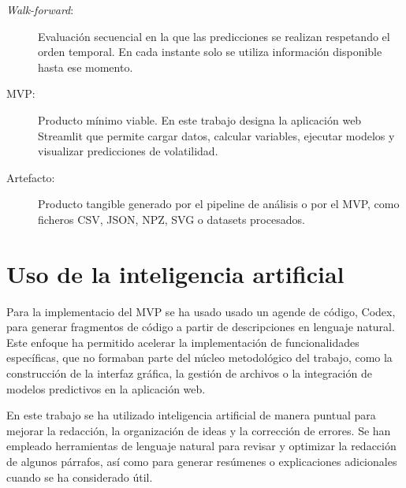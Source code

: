\begin{description}
    \item[\textit{Walk-forward}:] Evaluación secuencial en la que las predicciones se realizan respetando el orden temporal. En cada instante solo se utiliza información disponible hasta ese momento.

    \item[MVP:] Producto mínimo viable. En este trabajo designa la aplicación web Streamlit que permite cargar datos, calcular variables, ejecutar modelos y visualizar predicciones de volatilidad.

    \item[Artefacto:] Producto tangible generado por el pipeline de análisis o por el MVP, como ficheros CSV, JSON, NPZ, SVG o datasets procesados.
\end{description}

\chapter{Uso de la inteligencia artificial}\label{anexo:uso-ia}

Para la implementacio del MVP se ha usado usado un agende de código, Codex, para generar fragmentos de código a partir de descripciones en lenguaje natural. Este enfoque ha permitido acelerar la implementación de funcionalidades específicas, que no formaban parte del núcleo metodológico del trabajo, como la construcción de la interfaz gráfica, la gestión de archivos o la integración de modelos predictivos en la aplicación web.

En este trabajo se ha utilizado inteligencia artificial de manera puntual para mejorar la redacción, la organización de ideas y la corrección de errores. Se han empleado herramientas de lenguaje natural para revisar y optimizar la redacción de algunos párrafos, así como para generar resúmenes o explicaciones adicionales cuando se ha considerado útil.

